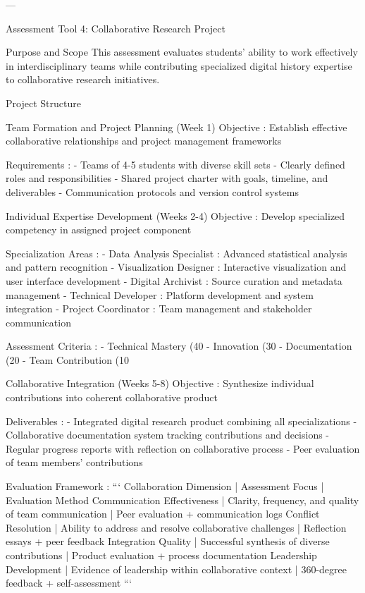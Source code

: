 \begin{appendices}
---

   Assessment Tool 4: Collaborative Research Project

    Purpose and Scope
This assessment evaluates students' ability to work effectively in interdisciplinary teams while contributing specialized digital history expertise to collaborative research initiatives.

    Project Structure

     Team Formation and Project Planning (Week 1)
 Objective : Establish effective collaborative relationships and project management frameworks

 Requirements :
- Teams of 4-5 students with diverse skill sets
- Clearly defined roles and responsibilities
- Shared project charter with goals, timeline, and deliverables
- Communication protocols and version control systems

     Individual Expertise Development (Weeks 2-4)
 Objective : Develop specialized competency in assigned project component

 Specialization Areas :
-  Data Analysis Specialist : Advanced statistical analysis and pattern recognition
-  Visualization Designer : Interactive visualization and user interface development
-  Digital Archivist : Source curation and metadata management
-  Technical Developer : Platform development and system integration
-  Project Coordinator : Team management and stakeholder communication

 Assessment Criteria :
-  Technical Mastery  (40%
-  Innovation  (30%
-  Documentation  (20%
-  Team Contribution  (10%

     Collaborative Integration (Weeks 5-8)
 Objective : Synthesize individual contributions into coherent collaborative product

 Deliverables :
- Integrated digital research product combining all specializations
- Collaborative documentation system tracking contributions and decisions
- Regular progress reports with reflection on collaborative process
- Peer evaluation of team members' contributions

 Evaluation Framework :
```
Collaboration Dimension | Assessment Focus | Evaluation Method
Communication Effectiveness | Clarity, frequency, and quality of team communication | Peer evaluation + communication logs
Conflict Resolution | Ability to address and resolve collaborative challenges | Reflection essays + peer feedback
Integration Quality | Successful synthesis of diverse contributions | Product evaluation + process documentation
Leadership Development | Evidence of leadership within collaborative context | 360-degree feedback + self-assessment
```


\end{appendices}
